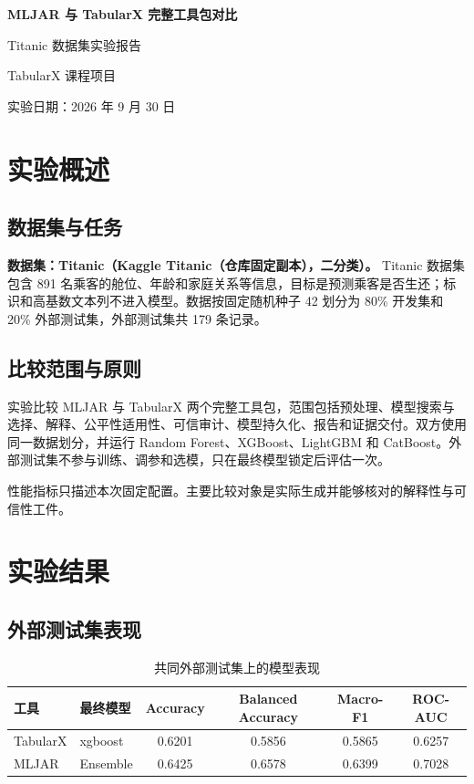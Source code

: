 \documentclass[degree=bachelor,language=chinese,fontset=fandol]{thuthesis}
\begin{document}
\begin{titlepage}
  \centering
  \vspace*{2.3cm}
  {\bfseries MLJAR 与 TabularX 完整工具包对比\par}
  \vspace{1.2cm}
  {Titanic 数据集实验报告\par}
  \vspace{2.2cm}
  {TabularX 课程项目\par}
  \vfill
  {实验日期：2026 年 9 月 30 日\par}
  \vspace{1.2cm}
\end{titlepage}

\frontmatter
\tableofcontents
\mainmatter
\chapter{实验概述}
\section{数据集与任务}
\textbf{数据集：Titanic（Kaggle Titanic（仓库固定副本），二分类）。}
Titanic 数据集包含 891 名乘客的舱位、年龄和家庭关系等信息，目标是预测乘客是否生还；标识和高基数文本列不进入模型。数据按固定随机种子 42 划分为 80\% 开发集和 20\% 外部测试集，外部测试集共 179 条记录。

\section{比较范围与原则}
实验比较 MLJAR 与 TabularX 两个完整工具包，范围包括预处理、模型搜索与选择、解释、公平性适用性、可信审计、模型持久化、报告和证据交付。双方使用同一数据划分，并运行 Random Forest、XGBoost、LightGBM 和 CatBoost。外部测试集不参与训练、调参和选模，只在最终模型锁定后评估一次。

性能指标只描述本次固定配置。主要比较对象是实际生成并能够核对的解释性与可信性工件。

\chapter{实验结果}
\section{外部测试集表现}
\begin{table}[htbp]
  \centering
  \small
  \caption{共同外部测试集上的模型表现}
  \begin{tabular}{llcccc}
    \toprule
    工具 & 最终模型 & Accuracy & Balanced Accuracy & Macro-F1 & ROC-AUC \\
    \midrule
    TabularX & xgboost & 0.6201 & 0.5856 & 0.5865 & 0.6257 \\
    MLJAR & Ensemble & 0.6425 & 0.6578 & 0.6399 & 0.7028 \\
    \bottomrule
  \end{tabular}
\end{table}
\end{document}
